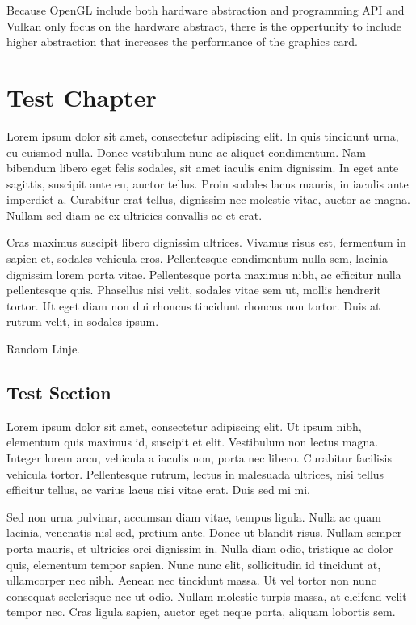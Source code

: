 
Because OpenGL include both hardware abstraction and programming API and Vulkan only focus on the hardware abstract, there is the oppertunity to include higher abstraction that increases the performance of the graphics card.

\chapter{Test Chapter}\label{ch:test}
\begin{chaptermeta}
Lorem ipsum dolor sit amet, consectetur adipiscing elit. 
In quis tincidunt urna, eu euismod nulla. 
Donec vestibulum nunc ac aliquet condimentum. 
Nam bibendum libero eget felis sodales, sit amet iaculis enim dignissim. 
In eget ante sagittis, suscipit ante eu, auctor tellus. 
Proin sodales lacus mauris, in iaculis ante imperdiet a. 
Curabitur erat tellus, dignissim nec molestie vitae, auctor ac magna. 
Nullam sed diam ac ex ultricies convallis ac et erat. \cite{test01}
\end{chaptermeta}

Cras maximus suscipit libero dignissim ultrices. 
Vivamus risus est, fermentum in sapien et, sodales vehicula eros. 
Pellentesque condimentum nulla sem, lacinia dignissim lorem porta vitae. 
Pellentesque porta maximus nibh, ac efficitur nulla pellentesque quis. 
Phasellus nisi velit, sodales vitae sem ut, mollis hendrerit tortor. 
Ut eget diam non dui rhoncus tincidunt rhoncus non tortor. 
Duis at rutrum velit, in sodales ipsum.

Random Linje.

\section{Test Section}\label{sec:test}
\begin{sectionmeta}
Lorem ipsum dolor sit amet, consectetur adipiscing elit. 
Ut ipsum nibh, elementum quis maximus id, suscipit et elit. 
Vestibulum non lectus magna. 
Integer lorem arcu, vehicula a iaculis non, porta nec libero. 
Curabitur facilisis vehicula tortor. 
Pellentesque rutrum, lectus in malesuada ultrices, nisi tellus efficitur tellus, ac varius lacus nisi vitae erat. 
Duis sed mi mi. 
\end{sectionmeta}

Sed non urna pulvinar, accumsan diam vitae, tempus ligula. 
Nulla ac quam lacinia, venenatis nisl sed, pretium ante. 
Donec ut blandit risus. 
Nullam semper porta mauris, et ultricies orci dignissim in. 
Nulla diam odio, tristique ac dolor quis, elementum tempor sapien. 
Nunc nunc elit, sollicitudin id tincidunt at, ullamcorper nec nibh. 
Aenean nec tincidunt massa. 
Ut vel tortor non nunc consequat scelerisque nec ut odio. 
Nullam molestie turpis massa, at eleifend velit tempor nec. 
Cras ligula sapien, auctor eget neque porta, aliquam lobortis sem.

